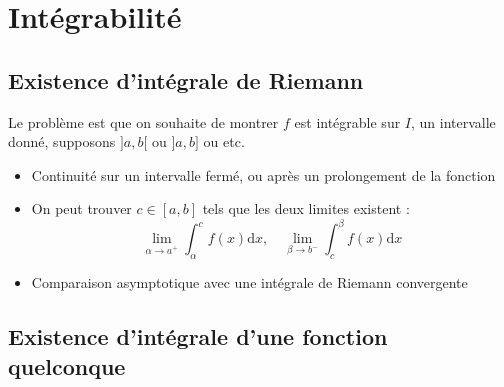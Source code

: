 \section{Intégrabilité} %

\subsection{Existence d'intégrale de Riemann} %
\label{sub:Existence d'intégrale de Riemann}

Le problème est que on souhaite de montrer $f$ est intégrable sur $I$, un intervalle donné, supposons $]a,b[$ ou $]a,b]$ ou etc.
\begin{itemize}

    \item Continuité sur un intervalle fermé, ou après un prolongement de la fonction 
    \item On peut trouver $c \in [a,b]$ tels que les deux limites existent : 
\begin{equation}
  \underset{\alpha \to a ^{+}}{\lim} \int_{\alpha}^{c} f(x) \mathrm{d}x , \quad \underset{\beta \to b ^{-}}{\lim} \int_{c}^{\beta} f(x) \mathrm{d}x
\end{equation}
    \item Comparaison asymptotique avec une intégrale de Riemann convergente

\end{itemize}

\subsection{Existence d'intégrale d'une fonction quelconque} %

